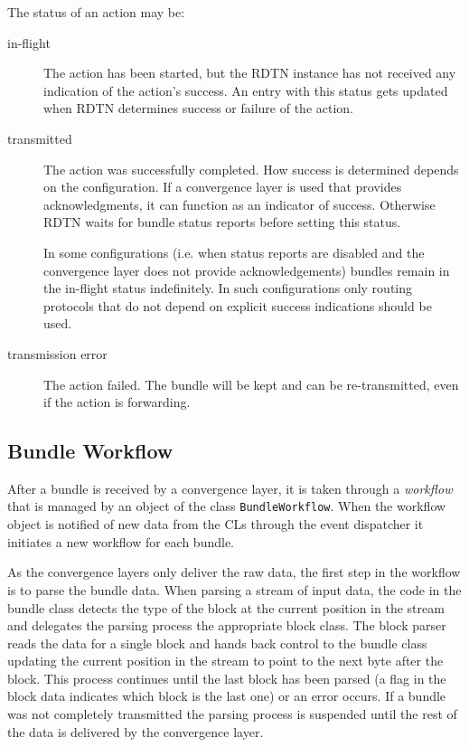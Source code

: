 \documentclass[a4paper]{article}
\begin{document}
The status of an action may be:
\begin{description}

\item[in-flight] The action has been started, but the RDTN instance has not
received any indication of the action's success. An entry with this status gets
updated when RDTN determines success or failure of the action.

\item[transmitted] The action was successfully completed. How success is
determined depends on the configuration. If a convergence layer is used that
provides acknowledgments, it can function as an indicator of success. Otherwise
RDTN waits for bundle status reports before setting this status.

In some configurations (i.e. when status reports are disabled and the
convergence layer does not provide acknowledgements) bundles remain in the
in-flight status indefinitely. In such configurations only routing protocols
that do not depend on explicit success indications should be used.

\item[transmission error] The action failed. The bundle will be kept and can be
re-transmitted, even if the action is forwarding.

\end{description}

\subsection{Bundle Workflow}\label{sec.workflow}

After a bundle is received by a convergence layer, it is taken through a {\em
workflow} that is managed by an object of the class {\tt BundleWorkflow}. When
the workflow object is notified of new data from the CLs through the event
dispatcher it initiates a new workflow for each bundle.

As the convergence layers only deliver the raw data, the first step in the
workflow is to parse the bundle data.  When parsing a stream of input
data, the code in the bundle class detects the type of the block at the current
position in the stream and delegates the parsing process the appropriate block
class. The block parser reads the data for a single block and hands back control
to the bundle class updating the current position in the stream to point to the
next byte after the block. This process continues until the last block has been
parsed (a flag in the block data indicates which block is the last one) or an
error occurs. If a bundle was not completely transmitted the parsing process is
suspended until the rest of the data is delivered by the convergence layer.
\end{document}
